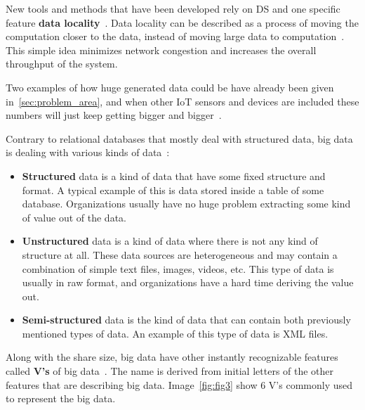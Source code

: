 New tools and methods that have been developed rely on DS and one specific feature \textbf{data locality}~\label{ds:data_locality}. Data locality can be described as a process of moving the computation closer to the data, instead of moving large data to computation~\cite{GuoFZ12}. This simple idea minimizes network congestion and increases the overall throughput of the system.

Two examples of how huge generated data could be have already been given in~\ref{sec:problem_area}, and when other IoT sensors and devices are included these numbers will just keep getting bigger and bigger~\cite{SarigiannidisLR20}.

Contrary to relational databases that mostly deal with structured data, big data is dealing with various kinds of data~\cite{FisherDCD12, Tsai2015, GuoFZ12}:

\begin{itemize}
	\item \textbf{Structured} data is a kind of data that have some fixed structure and format. A typical example of this is data stored inside a table of some database. Organizations usually have no huge problem extracting some kind of value out of the data.
	\item \textbf{Unstructured} data is a kind of data where there is not any kind of structure at all. These data sources are heterogeneous and may contain a combination of simple text files, images, videos, etc. This type of data is usually in raw format, and organizations have a hard time deriving the value out.
	\item \textbf{Semi-structured} data is the kind of data that can contain both previously mentioned types of data. An example of this type of data is XML files.
\end{itemize}

\noindent
Along with the share size, big data have other instantly recognizable features called \textbf{V's} of big data~\cite{PatgiriA16}. The name is derived from initial letters of the other features that are describing big data. Image~\ref{fig:fig3} show 6 V's commonly used to represent the big data.

